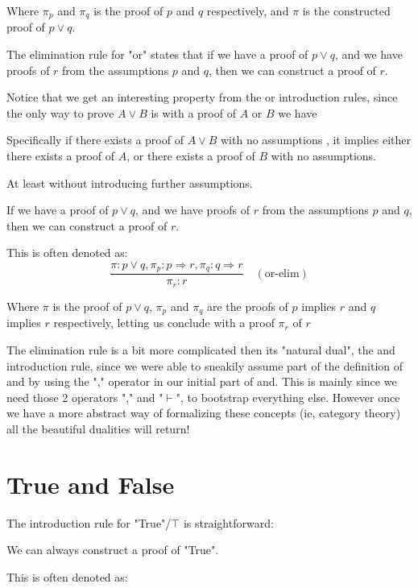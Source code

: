 Where $\pi_p$ and $\pi_q$ is the proof of $p$ and $q$ respectively, and $\pi$ is the constructed proof of $p \lor q$.



The elimination rule for "or" states that if we have a proof of $p \lor q$, and we have proofs of $r$ from the assumptions $p$ and $q$, then we can construct a proof of $r$.

Notice that we get an interesting property from the or introduction rules, since the only way to prove $A \lor B$ is with a proof of $A$ or $B$ we have
\begin{lemma}[Disjunction]
    Specifically if there exists a proof of $A \lor B$ with no assumptions , it implies either there exists a proof of $A$, or there exists a proof of $B$ with no assumptions.
\end{lemma}
At least without introducing further assumptions.

\begin{definition}[Or Elimination]
    If we have a proof of $p \lor q$, and we have proofs of $r$ from the assumptions $p$ and $q$, then we can construct a proof of $r$.
\end{definition}

This is often denoted as:
\begin{equation*}
\frac{\pi : p \lor q, \pi_{p} : p \Rightarrow r, \pi_{q} : q \Rightarrow r}{\pi_r : r}
    \quad(\text{or-elim})
\end{equation*}

Where $\pi$ is the proof of $p \lor q$, $\pi_p$ and $\pi_q$ are the proofs of $p$ implies $r$ and $q$ implies $r$ respectively, letting us conclude with a proof $\pi_r$ of $r$



The elimination rule is a bit more complicated then its "natural dual", the and introduction rule, since we were able to sneakily assume part of the definition of and by using the "," operator in our initial part of and. This is mainly since we need those 2 operators "," and "$\vdash$", to bootstrap everything else. However once we have a more abstract way of formalizing these concepts (ie, category theory) all the beautiful dualities will return!

\section{True and False}
 
 The introduction rule for "True"/$\top$ is straightforward:
 \begin{definition}
We can always construct a proof of "True".
\end{definition} 
This is often denoted as:

